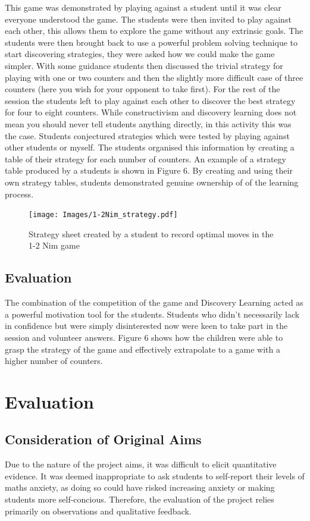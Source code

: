 \documentclass[11pt, a4paper, notitlepage]{article}
\begin{document}
This game was demonstrated by playing against a student until it was clear everyone understood the game. The students were then invited to play against each other, this allows them to explore the game without any extrinsic goals. The students were then brought back to use a powerful problem solving technique to start discovering strategies, they were asked how we could make the game simpler. With some guidance students then discussed the trivial strategy for playing with one or two counters and then the slightly more difficult case of three counters (here you wish for your opponent to take first). For the rest of the session the students left to play against each other to discover the best strategy for four to eight counters. While constructivism and discovery learning does not mean you should never tell students anything directly, in this activity this was the case. Students conjectured strategies which were tested by playing against other students or myself. The students organised this information by creating a table of their strategy for each number of counters. An example of a strategy table produced by a students is shown in Figure 6. By creating and using their own strategy tables, students demonstrated genuine ownership of of the learning process.

\begin{figure}[htbp]
    \centering
    \texttt{[image: Images/1-2Nim\_strategy.pdf]}
    \caption{Strategy sheet created by a student to record optimal moves in the 1-2 Nim game}
\end{figure}

\subsection*{Evaluation}
The combination of the competition of the game and Discovery Learning acted as a powerful motivation tool for the students. Students who didn't necessarily lack in confidence but were simply disinterested now were keen to take part in the session and  volunteer answers. Figure 6 shows how the children were able to grasp the strategy of the game and effectively extrapolate to a game with a higher number of counters.
\section{Evaluation}

\subsection{Consideration of Original Aims}
Due to the nature of the project aims, it was difficult to elicit quantitative evidence. It was deemed inappropriate to ask students to self-report their levels of maths anxiety, as doing so could have risked increasing anxiety or making students more self-concious. Therefore, the evaluation of the project relies primarily on observations and qualitative feedback.
\end{document}
